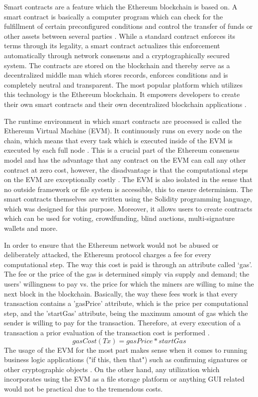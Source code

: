 Smart contracts are a feature which the Ethereum blockchain is based on. A smart contract is basically a computer program which can check for the fulfillment of certain preconfigured conditions and control the transfer of funds or other assets between several parties \cite{relatedWork38}. While a standard contract enforces its terms through its legality, a smart contract actualizes this enforcement automatically through network consensus and a cryptographically secured system. The contracts are stored on the blockchain and thereby serve as a decentralized middle man which stores records, enforces conditions and is completely neutral and transparent. The most popular platform which utilizes this technology is the Ethereum blockchain. It empowers developers to create their own smart contracts and their own decentralized blockchain applications \cite{relatedWork38}.

The runtime environment in which smart contracts are processed is called the Ethereum Virtual Machine (EVM). It continuously runs on every node on the chain, which means that every task which is executed inside of the EVM is executed by each full node \cite{relatedWork38}. This is a crucial part of the Ethereum consensus model and has the advantage that any contract on the EVM can call any other contract at zero cost, however, the disadvantage is that the computational steps on the EVM are exceptionally costly \cite{relatedWork38}. The EVM is also isolated in the sense that no outside framework or file system is accessible, this to ensure determinism. The smart contracts themselves are written using the Solidity programming language, which was designed for this purpose. Moreover, it allows users to create contracts which can be used for voting, crowdfunding, blind auctions, multi-signature wallets and more.

In order to ensure that the Ethereum network would not be abused or deliberately attacked, the Ethereum protocol charges a fee for every computational step. The way this cost is paid is through an attribute called ‘gas’. The fee or the price of the gas is determined simply via supply and demand; the users’ willingness to pay vs. the price for which the miners are willing to mine the next block in the blockchain. Basically, the way these fees work is that every transaction contains a 'gasPrice' attribute, which is the price per computational step, and the 'startGas' attribute, being the maximum amount of gas which the sender is willing to pay for the transaction. Therefore, at every execution of a transaction a prior evaluation of the transaction cost is performed \cite{relatedWork38}.
$$ gasCost(Tx)= {gasPrice * startGas}$$
The usage of the EVM for the most part makes sense when it comes to running business logic applications ("if this, then that") such as confirming signatures or other cryptographic objects \cite{relatedWork39}. On the other hand, any utilization which incorporates using the EVM as a file storage platform or anything GUI related would not be practical due to the tremendous costs.


